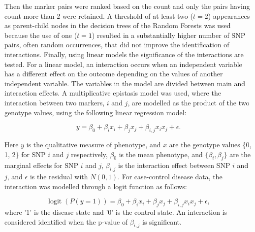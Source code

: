 \documentclass[authoryear,preprint,12pt,3p]{elsarticle}
\DeclareMathOperator{\logit}{\textrm{logit}}
\begin{document}
Then the marker pairs were ranked based on the count and only the pairs having count
more than 2 were retained. A threshold of at least two ($t = 2$) appearances as parent-child nodes in the decision trees
of the Random Forests was used because the use of one ($t = 1$) resulted in a substantially higher number of SNP pairs,
often random occurrences, that did not improve the identification of interactions.  Finally, using linear models the
significance of the interactions are tested. For a linear model, an interaction occurs when an independent variable has
a different effect on the outcome depending on the values of another independent variable. The variables in the model
are divided between main and interaction effects. A multiplicative epistasis model was used, where the interaction
between two markers, $i$ and $j$, are modelled as the product of the two genotype values, using the following linear
regression model:

\begin{equation}
  y = \beta_0 + \beta_i x_i +  \beta_j x_j + \beta_{i,j} x_ix_j + \epsilon.
  \label{eqn:linearmmodel}
\end{equation}

Here $y$ is the qualitative measure of phenotype, and $x$ are the genotype values \{0, 1, 2\}  for SNP $i$ and $j$ respectively,
$\beta_0$ is the mean phenotype, and  $\{\beta_i, \beta_j\}$ are the marginal effects for SNP $i$ and $j$, $\beta_{i,j}$
is the interaction effect between SNP $i$  and  $j$, and $\epsilon$ is the residual with $N(0,1)$. For case-control disease data, the interaction was modelled
through a logit function as follows:




\begin{equation}
  \logit (P(y =1)) =  \beta_0 + \beta_i x_i +  \beta_j x_j + \beta_{i,j} x_ix_j + \epsilon,
  \label{eqn:logitmodel}
\end{equation}
where '1' is the disease state and '0' is the control state.  An interaction is considered identified when the p-value of $\beta_{i,j}$ is significant.
\end{document}
